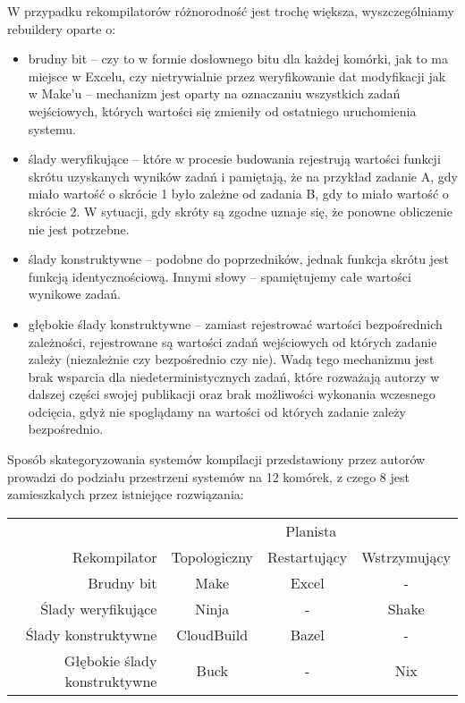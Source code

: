 W przypadku rekompilatorów różnorodność jest trochę większa, wyszczególniamy rebuildery oparte o:
\begin{itemize}
\item brudny bit -- czy to w formie dosłownego bitu dla każdej komórki, jak to ma miejsce w Excelu, czy nietrywialnie przez weryfikowanie dat modyfikacji jak w Make'u -- mechanizm jest oparty na oznaczaniu wszystkich zadań wejściowych, których wartości się zmieniły od ostatniego uruchomienia systemu.
\item ślady weryfikujące -- które w procesie budowania rejestrują wartości funkcji skrótu uzyskanych wyników zadań i pamiętają, że na przykład zadanie A, gdy miało wartość o skrócie 1 było zależne od zadania B, gdy to miało wartość o skrócie 2. W sytuacji, gdy skróty są zgodne uznaje się, że ponowne obliczenie nie jest potrzebne.
\item ślady konstruktywne -- podobne do poprzedników, jednak funkcja skrótu jest funkcją identycznościową. Innymi słowy -- spamiętujemy całe wartości wynikowe zadań.
\item głębokie ślady konstruktywne -- zamiast rejestrować wartości bezpośrednich zależności, rejestrowane są wartości zadań wejściowych od których zadanie zależy (niezależnie czy bezpośrednio czy nie). Wadą tego mechanizmu jest brak wsparcia dla niedeterministycznych zadań, które rozważają autorzy w dalszej części swojej publikacji oraz brak możliwości wykonania wczesnego odcięcia, gdyż nie spoglądamy na wartości od których zadanie zależy bezpośrednio.
\end{itemize}

Sposób skategoryzowania systemów kompilacji przedstawiony przez autorów prowadzi do podziału przestrzeni systemów na 12 komórek, z czego 8 jest zamieszkałych przez istniejące rozwiązania:

\begin{tabular}{r | c c c}
\hline
                             & \multicolumn{3}{c}{Planista} \\
Rekompilator                 & Topologiczny & Restartujący & Wstrzymujący \\
\hline
Brudny bit                   & Make         & Excel        & - \\
Ślady weryfikujące           & Ninja        & -            & Shake \\
Ślady konstruktywne          & CloudBuild   & Bazel        & -\\
Głębokie ślady konstruktywne & Buck         & -            & Nix \\
\hline
\end{tabular}

